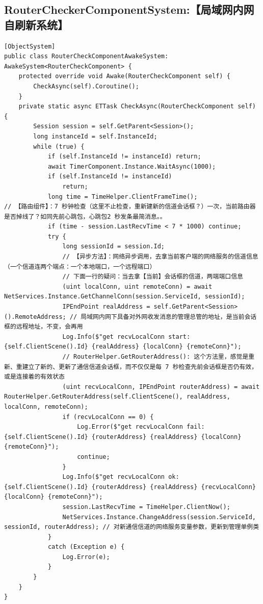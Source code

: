 \documentclass[9pt, b5paper]{article}
\begin{document}
\subsection{RouterCheckerComponentSystem:【局域网内网自刷新系统】}
\label{sec:orgb70004a}
\begin{verbatim}
[ObjectSystem]
public class RouterCheckComponentAwakeSystem: AwakeSystem<RouterCheckComponent> {
    protected override void Awake(RouterCheckComponent self) {
        CheckAsync(self).Coroutine();
    }
    private static async ETTask CheckAsync(RouterCheckComponent self) {
        Session session = self.GetParent<Session>();
        long instanceId = self.InstanceId;
        while (true) {
            if (self.InstanceId != instanceId) return;
            await TimerComponent.Instance.WaitAsync(1000);
            if (self.InstanceId != instanceId) 
                return;
            long time = TimeHelper.ClientFrameTime();
// 【路由组件】：7 秒钟检查（这里不止检查，重新建新的信道会话框？）一次，当前路由器是否掉线了？如同先前心跳包，心跳包2 秒发条最简消息。。
            if (time - session.LastRecvTime < 7 * 1000) continue;
            try {
                long sessionId = session.Id;
                // 【异步方法】：网络异步调用，去拿当前客户端的网络服务的信道信息（一个信道连两个端点：一个本地端口，一个远程端口）
                // 下面一行的疑问：当去拿【当前】会话框的信道，两端端口信息
                (uint localConn, uint remoteConn) = await NetServices.Instance.GetChannelConn(session.ServiceId, sessionId);
                IPEndPoint realAddress = self.GetParent<Session>().RemoteAddress; // 局域网内网下具备对外网收发消息的管理总管的地址，是当前会话框的远程地址，不变，会再用
                Log.Info($"get recvLocalConn start: {self.ClientScene().Id} {realAddress} {localConn} {remoteConn}");
                // RouterHelper.GetRouterAddress(): 这个方法里，感觉是重新、重建立了新的、更新了通信信道会话框，而不仅仅是每 7 秒检查先前会话框是否仍有效，或是连接着的有效状态 
                (uint recvLocalConn, IPEndPoint routerAddress) = await RouterHelper.GetRouterAddress(self.ClientScene(), realAddress, localConn, remoteConn);
                if (recvLocalConn == 0) {
                    Log.Error($"get recvLocalConn fail: {self.ClientScene().Id} {routerAddress} {realAddress} {localConn} {remoteConn}");
                    continue;
                }
                Log.Info($"get recvLocalConn ok: {self.ClientScene().Id} {routerAddress} {realAddress} {recvLocalConn} {localConn} {remoteConn}");
                session.LastRecvTime = TimeHelper.ClientNow();
                NetServices.Instance.ChangeAddress(session.ServiceId, sessionId, routerAddress); // 对新通信信道的网络服务变量参数，更新到管理单例类
            }
            catch (Exception e) {
                Log.Error(e);
            }
        }
    }
}
\end{verbatim}
\end{document}
